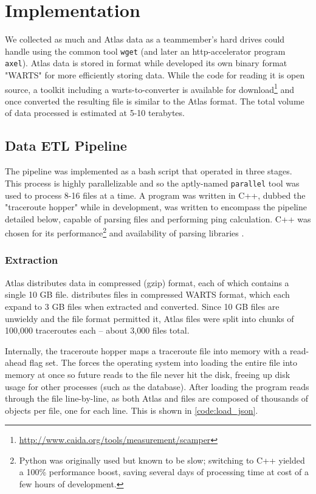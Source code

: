 \section{Implementation}\label{sec:caida_impl}

We collected as much \caida and \ripe Atlas data as a teammember's hard drives could handle using the common tool \texttt{wget} (and later an http-accelerator program \texttt{axel}). \ripe Atlas data is stored in \json format while \caida developed its own binary format "WARTS" for more efficiently storing data. While the code for reading it is open source, a toolkit including a warts-to-\json converter is available for download\footnote{\url{http://www.caida.org/tools/measurement/scamper}} and once converted the resulting \json file is similar to the \ripe Atlas format. The total volume of data processed is estimated at 5-10 terabytes.

\subsection{Data ETL Pipeline}

The pipeline was implemented as a bash script that operated in three stages. This process is highly parallelizable and so the aptly-named \texttt{parallel} tool \cite{Tange2011} was used to process 8-16 files at a time. A \cli program was written in C++, dubbed the "traceroute hopper" while in development, was written to encompass the \etl pipeline detailed below, capable of parsing \json files and performing ping calculation. C++ was chosen for its performance\footnote{Python was originally used but known to be slow; switching to C++ yielded a 100\% performance boost, saving several days of processing time at cost of a few hours of development.} and availability of \json parsing libraries \cite{Tencent2016RapidJSON}.

\subsubsection{Extraction} \ripe Atlas distributes data in compressed (gzip) format, each of which contains a single 10 GB \json file. \caida distributes files in compressed WARTS format, which each expand to 3 GB \json files when extracted and converted. Since 10 GB files are unwieldy and the file format permitted it, \ripe Atlas files were split into chunks of 100,000 traceroutes each -- about 3,000 files total.

Internally, the traceroute hopper maps a traceroute file into memory with a read-ahead flag set. The forces the operating system into loading the entire file into memory at once so future reads to the file never hit the disk, freeing up disk usage for other processes (such as the database). After loading the program reads through the file line-by-line, as both \ripe Atlas and \caida \json files are composed of thousands of \json objects per file, one for each line. This is shown in \cref{code:load_json}.

